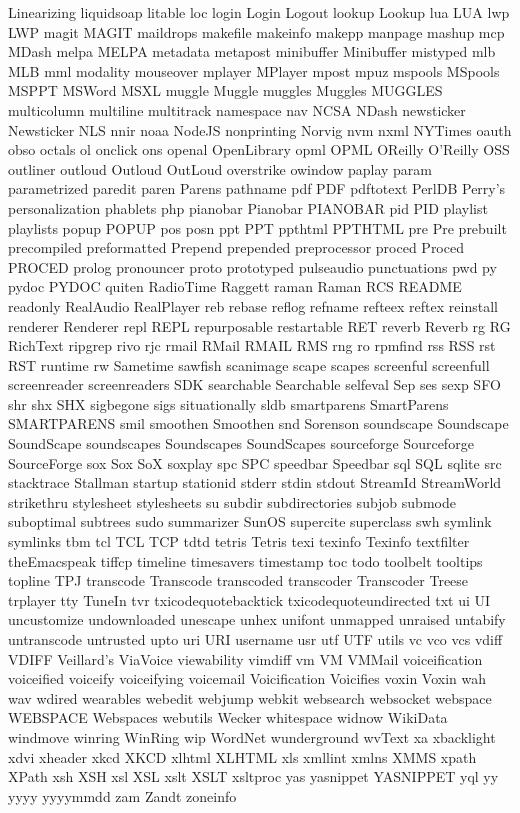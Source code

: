 Linearizing
liquidsoap
litable
loc
login
Login
Logout
lookup
Lookup
lua
LUA
lwp
LWP
magit
MAGIT
maildrops
makefile
makeinfo
makepp
manpage
mashup
mcp
MDash
melpa
MELPA
metadata
metapost
minibuffer
Minibuffer
mistyped
mlb
MLB
mml
modality
mouseover
mplayer
MPlayer
mpost
mpuz
mspools
MSpools
MSPPT
MSWord
MSXL
muggle
Muggle
muggles
Muggles
MUGGLES
multicolumn
multiline
multitrack
namespace
nav
NCSA
NDash
newsticker
Newsticker
NLS
nnir
noaa
NodeJS
nonprinting
Norvig
nvm
nxml
NYTimes
oauth
obso
octals
ol
onclick
ons
openal
OpenLibrary
opml
OPML
OReilly
O'Reilly
OSS
outliner
outloud
Outloud
OutLoud
overstrike
owindow
paplay
param
parametrized
paredit
paren
Parens
pathname
pdf
PDF
pdftotext
PerlDB
Perry's
personalization
phablets
php
pianobar
Pianobar
PIANOBAR
pid
PID
playlist
playlists
popup
POPUP
pos
posn
ppt
PPT
ppthtml
PPTHTML
pre
Pre
prebuilt
precompiled
preformatted
Prepend
prepended
preprocessor
proced
Proced
PROCED
prolog
pronouncer
proto
prototyped
pulseaudio
punctuations
pwd
py
pydoc
PYDOC
quiten
RadioTime
Raggett
raman
Raman
RCS
README
readonly
RealAudio
RealPlayer
reb
rebase
reflog
refname
refteex
reftex
reinstall
renderer
Renderer
repl
REPL
repurposable
restartable
RET
reverb
Reverb
rg
RG
RichText
ripgrep
rivo
rjc
rmail
RMail
RMAIL
RMS
rng
ro
rpmfind
rss
RSS
rst
RST
runtime
rw
Sametime
sawfish
scanimage
scape
scapes
screenful
screenfull
screenreader
screenreaders
SDK
searchable
Searchable
selfeval
Sep
ses
sexp
SFO
shr
shx
SHX
sigbegone
sigs
situationally
sldb
smartparens
SmartParens
SMARTPARENS
smil
smoothen
Smoothen
snd
Sorenson
soundscape
Soundscape
SoundScape
soundscapes
Soundscapes
SoundScapes
sourceforge
Sourceforge
SourceForge
sox
Sox
SoX
soxplay
spc
SPC
speedbar
Speedbar
sql
SQL
sqlite
src
stacktrace
Stallman
startup
stationid
stderr
stdin
stdout
StreamId
StreamWorld
strikethru
stylesheet
stylesheets
su
subdir
subdirectories
subjob
submode
suboptimal
subtrees
sudo
summarizer
SunOS
supercite
superclass
swh
symlink
symlinks
tbm
tcl
TCL
TCP
tdtd
tetris
Tetris
texi
texinfo
Texinfo
textfilter
theEmacspeak
tiffcp
timeline
timesavers
timestamp
toc
todo
toolbelt
tooltips
topline
TPJ
transcode
Transcode
transcoded
transcoder
Transcoder
Treese
trplayer
tty
TuneIn
tvr
txicodequotebacktick
txicodequoteundirected
txt
ui
UI
uncustomize
undownloaded
unescape
unhex
unifont
unmapped
unraised
untabify
untranscode
untrusted
upto
uri
URI
username
usr
utf
UTF
utils
vc
vco
vcs
vdiff
VDIFF
Veillard's
ViaVoice
viewability
vimdiff
vm
VM
VMMail
voiceification
voiceified
voiceify
voiceifying
voicemail
Voicification
Voicifies
voxin
Voxin
wah
wav
wdired
wearables
webedit
webjump
webkit
websearch
websocket
webspace
WEBSPACE
Webspaces
webutils
Wecker
whitespace
widnow
WikiData
windmove
winring
WinRing
wip
WordNet
wunderground
wvText
xa
xbacklight
xdvi
xheader
xkcd
XKCD
xlhtml
XLHTML
xls
xmllint
xmlns
XMMS
xpath
XPath
xsh
XSH
xsl
XSL
xslt
XSLT
xsltproc
yas
yasnippet
YASNIPPET
yql
yy
yyyy
yyyymmdd
zam
Zandt
zoneinfo

